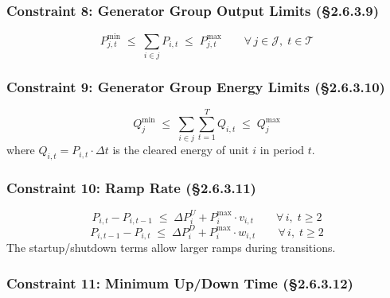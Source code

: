 \subsubsection{Constraint 8: Generator Group Output Limits (§2.6.3.9)}\label{sec:scuc-group-output}

\begin{equation}\label{eq:group-output}
  P^{\min}_{j,t} \;\leq\;
  \sum_{i \in j} P_{i,t}
  \;\leq\; P^{\max}_{j,t}
  \qquad \forall\, j \in \mathcal{J},\; t \in \mathcal{T}
\end{equation}

\subsubsection{Constraint 9: Generator Group Energy Limits (§2.6.3.10)}\label{sec:scuc-group-energy}

\begin{equation}\label{eq:group-energy}
  Q^{\min}_j \;\leq\;
  \sum_{i \in j} \sum_{t=1}^{T} Q_{i,t}
  \;\leq\; Q^{\max}_j
\end{equation}
where $Q_{i,t} = P_{i,t} \cdot \Delta t$ is the cleared energy of unit $i$
in period $t$.

\subsubsection{Constraint 10: Ramp Rate (§2.6.3.11)}\label{sec:scuc-ramp}

\begin{equation}\label{eq:ramp-up}
  P_{i,t} - P_{i,t-1} \;\leq\; \Delta P^{U}_i + P^{\max}_i \cdot v_{i,t}
  \qquad \forall\, i,\; t \geq 2
\end{equation}
\begin{equation}\label{eq:ramp-down}
  P_{i,t-1} - P_{i,t} \;\leq\; \Delta P^{D}_i + P^{\max}_i \cdot w_{i,t}
  \qquad \forall\, i,\; t \geq 2
\end{equation}
The startup/shutdown terms allow larger ramps during transitions.

\subsubsection{Constraint 11: Minimum Up/Down Time (§2.6.3.12)}\label{sec:scuc-minud}

